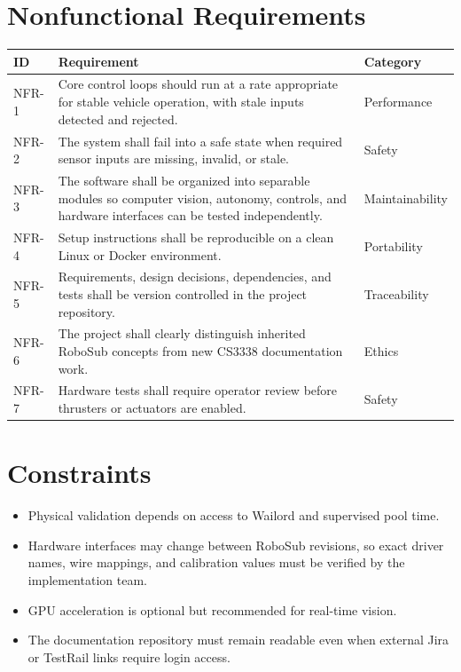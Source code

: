 \documentclass[12pt]{article}
\begin{document}
\section{Nonfunctional Requirements}
\begin{longtable}{|p{}|p{}|p{}|}
\hline
\textbf{ID} & \textbf{Requirement} & \textbf{Category} \\
\hline
NFR-1 & Core control loops should run at a rate appropriate for stable vehicle operation, with stale inputs detected and rejected. & Performance \\
\hline
NFR-2 & The system shall fail into a safe state when required sensor inputs are missing, invalid, or stale. & Safety \\
\hline
NFR-3 & The software shall be organized into separable modules so computer vision, autonomy, controls, and hardware interfaces can be tested independently. & Maintainability \\
\hline
NFR-4 & Setup instructions shall be reproducible on a clean Linux or Docker environment. & Portability \\
\hline
NFR-5 & Requirements, design decisions, dependencies, and tests shall be version controlled in the project repository. & Traceability \\
\hline
NFR-6 & The project shall clearly distinguish inherited RoboSub concepts from new CS3338 documentation work. & Ethics \\
\hline
NFR-7 & Hardware tests shall require operator review before thrusters or actuators are enabled. & Safety \\
\hline
\end{longtable}

\section{Constraints}
\begin{itemize}[leftmargin=*]
  \item Physical validation depends on access to Wailord and supervised pool time.
  \item Hardware interfaces may change between RoboSub revisions, so exact driver names, wire mappings, and calibration values must be verified by the implementation team.
  \item GPU acceleration is optional but recommended for real-time vision.
  \item The documentation repository must remain readable even when external Jira or TestRail links require login access.
\end{itemize}
\end{document}
